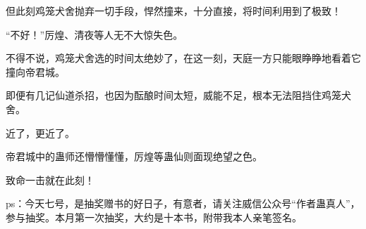 \begin{this_body}
但此刻鸡笼犬舍抛弃一切手段，悍然撞来，十分直接，将时间利用到了极致！

“不好！”厉煌、清夜等人无不大惊失色。

不得不说，鸡笼犬舍选的时间太绝妙了，在这一刻，天庭一方只能眼睁睁地看着它撞向帝君城。

即便有几记仙道杀招，也因为酝酿时间太短，威能不足，根本无法阻挡住鸡笼犬舍。

近了，更近了。

帝君城中的蛊师还懵懵懂懂，厉煌等蛊仙则面现绝望之色。

致命一击就在此刻！

ps：今天七号，是抽奖赠书的好日子，有意者，请关注威信公众号“作者蛊真人”，参与抽奖。本月第一次抽奖，大约是十本书，附带我本人亲笔签名。

\end{this_body}

